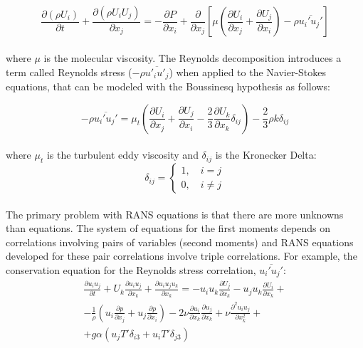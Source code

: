 \documentclass[a5paper]{sapthesis}
\begin{document}
	\begin{equation}
		\frac{\partial (\rho U_i)}{\partial t} + \frac{\partial (\rho U_i U_j)}{\partial x_j} = -\frac{\partial P}{\partial x_i} + \frac{\partial}{\partial x_j} \left[ \mu \left( \frac{\partial U_i}{\partial x_j} + \frac{\partial U_j}{\partial x_i} \right) - \rho \overline{u_i' u_j'} \right]
		\label{RANS}
	\end{equation}
	\\
	where $\mu$ is the molecular viscosity.	The Reynolds decomposition introduces a term called Reynolds stress ($-\rho \overline{u'_i u'_j}$) when applied to the Navier-Stokes equations, that can be modeled with the Boussinesq hypothesis \cite{boussinesq1877essai} as follows:
	
	\begin{equation}
		- \rho \overline{u_i' u_j'} = \mu_t \left( \frac{\partial U_i}{\partial x_j} + \frac{\partial U_j}{\partial x_i} - \frac{2}{3} \frac{\partial U_k}{\partial x_k} \delta_{ij} \right) - \frac{2}{3} \rho k \delta_{ij}
	\end{equation}
	\\
	where $\mu_t$ is the turbulent eddy viscosity and $\delta_{ij}$ is the Kronecker Delta:
	\begin{equation}
		\delta_{ij} = 
		\begin{cases}
			1,  \quad i=j \\
			0,  \quad i\neq j
		\end{cases}
	\end{equation}
	\\
	The primary problem with RANS equations is that there are more unknowns than equations. The system of equations for the first moments depends on correlations involving pairs of variables (second moments) and RANS equations developed for these pair correlations involve triple correlations. For example, the conservation equation for the Reynolds stress correlation, $\overline{u_i' u_j'}$:
	\begin{equation}
		\begin{aligned}
			\frac{\partial u_i u_j}{\partial t} + U_k \frac{\partial u_i u_j}{\partial x_k} + \frac{\partial u_i u_j u_k}{\partial x_k} = - u_i u_k \frac{\partial U_j}{\partial x_k} - u_j u_k \frac{\partial U_i}{\partial x_k} + \\
			-\frac{1}{\rho} \left( u_i \frac{\partial p}{\partial x_j} + u_j \frac{\partial p}{\partial x_i} \right)  
			- 2 \nu \frac{\partial u_i}{\partial x_k} \frac{\partial u_j}{\partial x_k} + \nu \frac{\partial^2 u_i u_j}{\partial x_k^2} + \\
			+ g \alpha \left( u_j T' \delta_{i3} + u_i T' \delta_{j3} \right)
		\end{aligned}
	\end{equation}
\end{document}
